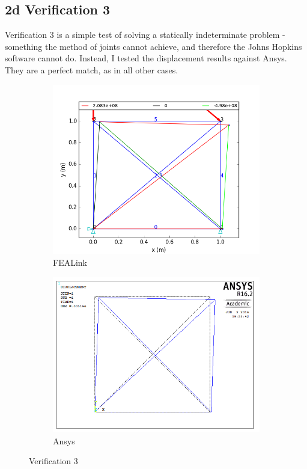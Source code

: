 \documentclass[11pt, oneside]{article}   	%
\begin{document}
\subsection{2d Verification 3}
Verification 3 is a simple test of solving a statically indeterminate problem - something the method of joints cannot achieve, and therefore the Johns Hopkins software cannot do.  Instead, I tested the displacement results against Ansys.  They are a perfect match, as in all other cases.

\begin{figure}[h]
\centering
  \begin{subfigure}[b]{0.45\textwidth}
    \includegraphics[width=\textwidth]{Verification/FEALink/Verification3.png}
    \caption{FEALink}
    \label{fig:V3FEALink}
  \end{subfigure}
  \begin{subfigure}[b]{0.45\textwidth}
    \includegraphics[width=\textwidth]{Verification/Ansys/Verification3.png}
    \caption{Ansys}
    \label{fig:V3Ansys}
  \end{subfigure}
\caption{Verification 3}
\label{fig:Verification3}%
\end{figure}
\end{document}
